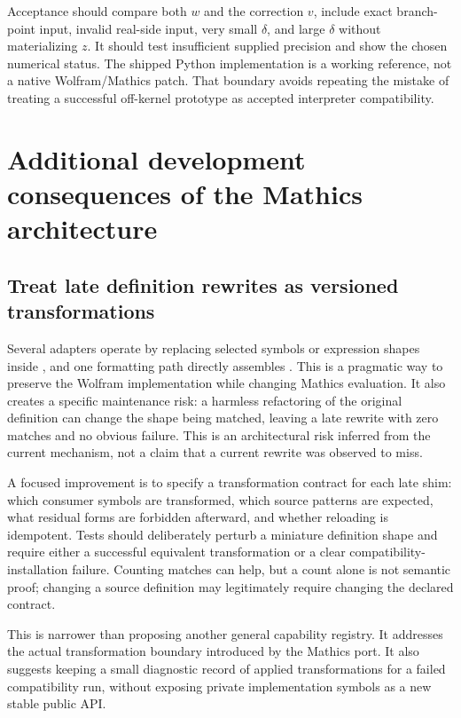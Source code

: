 \documentclass[11pt,letterpaper]{article}
\newcommand{\code}[1]{\texttt{\detokenize{#1}}}
\begin{document}
Acceptance should compare both $w$ and the correction $v$, include exact branch-point input, invalid real-side input, very small $\delta$, and large $\delta$ without materializing $z$. It should test insufficient supplied precision and show the chosen numerical status. The shipped Python implementation is a working reference, not a native Wolfram/Mathics patch. That boundary avoids repeating the mistake of treating a successful off-kernel prototype as accepted interpreter compatibility.

\section{Additional development consequences of the Mathics architecture}
\subsection{Treat late definition rewrites as versioned transformations}
Several adapters operate by replacing selected symbols or expression shapes inside \code{DownValues}, and one formatting path directly assembles \code{UpValues}. This is a pragmatic way to preserve the Wolfram implementation while changing Mathics evaluation. It also creates a specific maintenance risk: a harmless refactoring of the original definition can change the shape being matched, leaving a late rewrite with zero matches and no obvious failure. This is an architectural risk inferred from the current mechanism, not a claim that a current rewrite was observed to miss.\cite{mathicscore,mathicscertificate,mathicsrefine,mathicslists,mathicsformat}

A focused improvement is to specify a transformation contract for each late shim: which consumer symbols are transformed, which source patterns are expected, what residual forms are forbidden afterward, and whether reloading is idempotent. Tests should deliberately perturb a miniature definition shape and require either a successful equivalent transformation or a clear compatibility-installation failure. Counting matches can help, but a count alone is not semantic proof; changing a source definition may legitimately require changing the declared contract.

This is narrower than proposing another general capability registry. It addresses the actual \code{DownValues} transformation boundary introduced by the Mathics port. It also suggests keeping a small diagnostic record of applied transformations for a failed compatibility run, without exposing private implementation symbols as a new stable public API.
\end{document}

